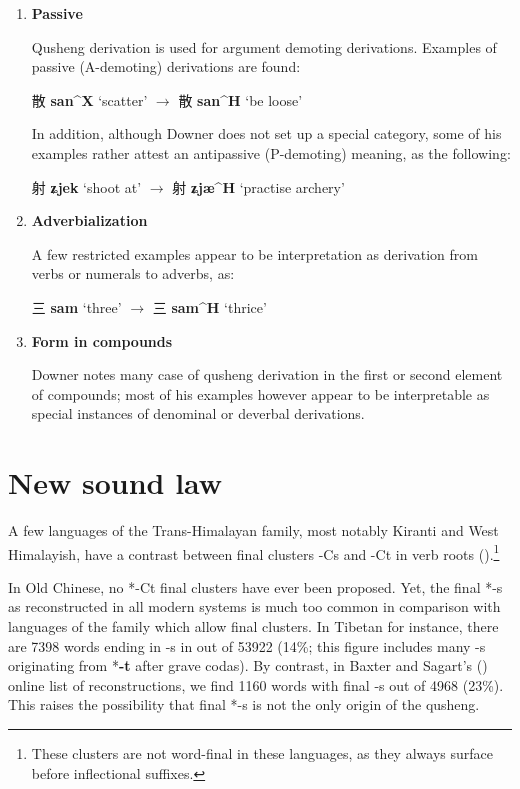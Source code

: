 \documentclass[oneside,a4paper,11pt]{article}
\newcommand{\ipa}[1]{{\phon\textbf{\mbox{#1}}}}
\newcommand{\zh}[1]{{\cn#1}}
\newcommand{\ch}[3]{\zh{#1} \ipa{#2} `#3'}
\begin{document}
\begin{enumerate}
\item \textbf{Passive}

Qusheng derivation is used for argument demoting derivations. Examples of passive (A-demoting) derivations are found:

\ch{散}{san^X}{scatter} $\rightarrow$ \ch{散}{san^H}{be loose} 

In addition, although Downer does not set up a special category, some of his examples rather attest an antipassive (P-demoting) meaning, as the following:

\ch{射}{ʑjek}{shoot at} $\rightarrow$ \ch{射}{ʑjæ^H}{practise archery} 

\item \textbf{Adverbialization}

A few restricted examples appear to be interpretation as derivation from verbs or numerals to adverbs, as:

\ch{三}{sam}{three} $\rightarrow$ \ch{三}{sam^H}{thrice} 

\item \textbf{Form in compounds}

Downer notes many case of qusheng derivation in the first or second element of compounds; most of his examples however appear to be interpretable as special instances of denominal or deverbal derivations.
\end{enumerate}

\section{New sound law}
A few languages of the Trans-Himalayan family, most notably Kiranti and West Himalayish, have a contrast between final clusters -Cs and -Ct in verb roots (\citealt{michailovsky85dental}).\footnote{These clusters are not word-final in these languages, as they always surface before inflectional suffixes.} 

In Old Chinese, no *-Ct final clusters have ever been proposed. Yet, the final *-s as reconstructed in all modern systems is much too common in comparison with languages of the family which allow final clusters. In Tibetan for instance, there are 7398 words ending in -s in  \citet{bodrgya} out of 53922 (14\%; this figure includes many -s originating from *\ipa{-t} after grave codas). By contrast, in Baxter and Sagart's (\citeyear{bs14oc}) online list of reconstructions, we find 1160 words with final -s out of 4968 (23\%). This raises the possibility that final *-s is not the only origin of the qusheng.
\end{document}
